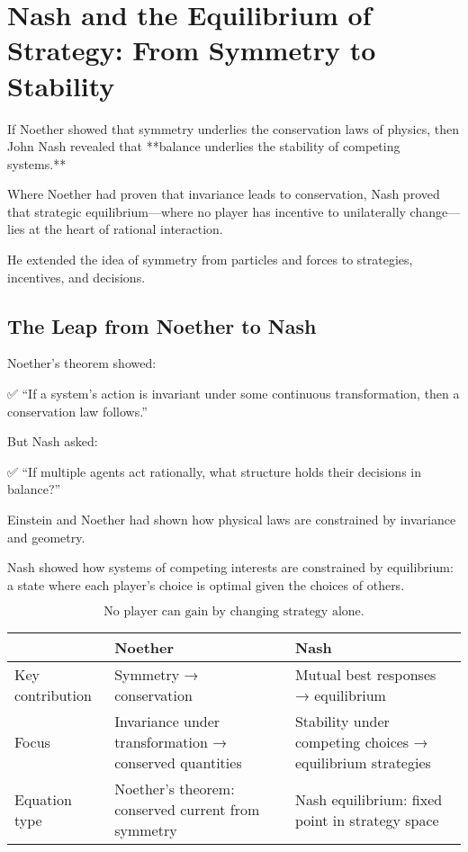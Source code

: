 \section{Nash and the Equilibrium of Strategy: From Symmetry to Stability}

If Noether showed that symmetry underlies the conservation laws of physics,  
then John Nash revealed that **balance underlies the stability of competing systems.**

Where Noether had proven that invariance leads to conservation,  
Nash proved that strategic equilibrium—where no player has incentive to unilaterally change—lies at the heart of rational interaction.

He extended the idea of symmetry from particles and forces  
to strategies, incentives, and decisions.

\bigskip

\subsection*{The Leap from Noether to Nash}

Noether’s theorem showed:

✅ “If a system’s action is invariant under some continuous transformation, then a conservation law follows.”

But Nash asked:

✅ “If multiple agents act rationally, what structure holds their decisions in balance?”

Einstein and Noether had shown how physical laws are constrained by invariance and geometry.

Nash showed how systems of competing interests are constrained by equilibrium:  
a state where each player’s choice is optimal given the choices of others.

\[
\boxed{\text{No player can gain by changing strategy alone.}}
\]

\bigskip

\begin{tcolorbox}[colback=gray!5!white, colframe=black, title=\textbf{Sidebar: The Shift from Noether to Nash}, fonttitle=\bfseries, arc=1.5mm, boxrule=0.4pt]

\begin{tabular}{>{\raggedright}p{4cm} >{\raggedright}p{5.5cm} >{\raggedright\arraybackslash}p{5.5cm}}
 & \textbf{Noether} & \textbf{Nash} \\
\midrule
Key contribution & Symmetry → conservation & Mutual best responses → equilibrium \\
Focus & Invariance under transformation → conserved quantities & Stability under competing choices → equilibrium strategies \\
Equation type & Noether’s theorem: conserved current from symmetry & Nash equilibrium: fixed point in strategy space
\end{tabular}

\end{tcolorbox}

